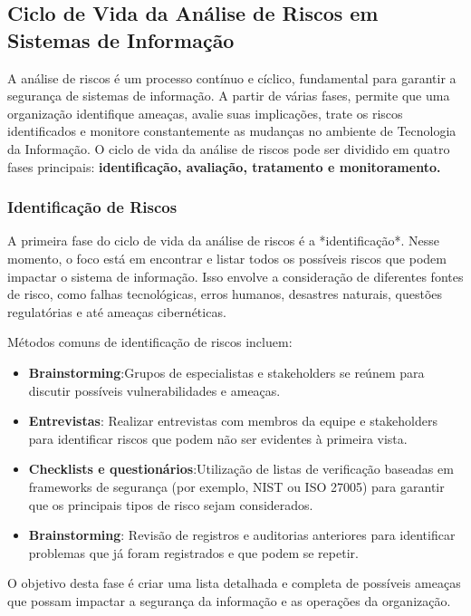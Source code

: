 \documentclass[12pt,oneside,a4paper,article]{abntex2}
\begin{document}
\subsection{Ciclo de Vida da Análise de Riscos em Sistemas de Informação}

{A análise de riscos é um processo contínuo e cíclico, fundamental para garantir a segurança de sistemas de informação. A partir de várias fases, permite que uma organização identifique ameaças, avalie suas implicações, trate os riscos identificados e monitore constantemente as mudanças no ambiente de Tecnologia da Informação. O ciclo de vida da análise de riscos pode ser dividido em quatro fases principais: \textbf{identificação, avaliação, tratamento e monitoramento.}}

\subsubsection{Identificação de Riscos}
{A primeira fase do ciclo de vida da análise de riscos é a *identificação*. Nesse momento, o foco está em encontrar e listar todos os possíveis riscos que podem impactar o sistema de informação. Isso envolve a consideração de diferentes fontes de risco, como falhas tecnológicas, erros humanos, desastres naturais, questões regulatórias e até ameaças cibernéticas.

Métodos comuns de identificação de riscos incluem:}



\begin{itemize}
    \item \textbf{Brainstorming}:Grupos de especialistas e stakeholders se reúnem para discutir possíveis vulnerabilidades e ameaças.
    \item \textbf{Entrevistas}: Realizar entrevistas com membros da equipe e stakeholders para identificar riscos que podem não ser evidentes à primeira vista.
    \item \textbf{Checklists e questionários}:Utilização de listas de verificação baseadas em frameworks de segurança (por exemplo, NIST ou ISO 27005) para garantir que os principais tipos de risco sejam considerados.
    \item \textbf{Brainstorming}: Revisão de registros e auditorias anteriores para identificar problemas que já foram registrados e que podem se repetir.
\end{itemize}

{O objetivo desta fase é criar uma lista detalhada e completa de possíveis ameaças que possam impactar a segurança da informação e as operações da organização.}
\end{document}
